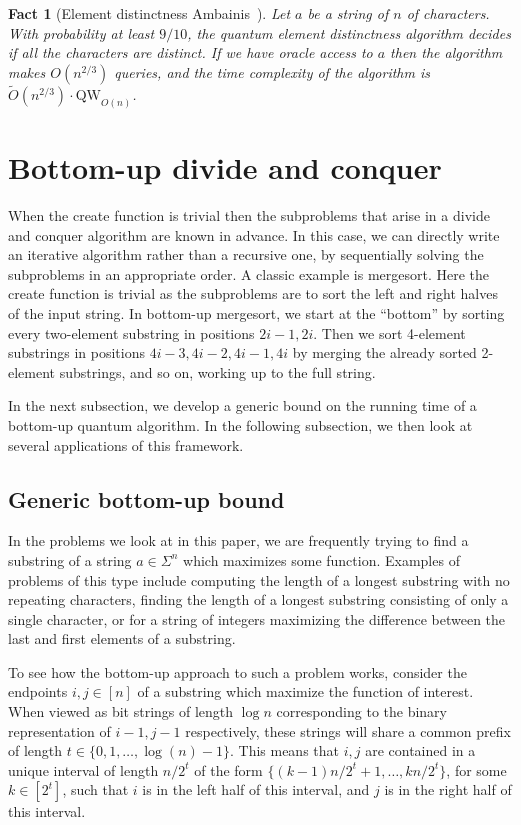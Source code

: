 \documentclass[12pt]{article}
\newcommand{\qw}{\mathrm{QW}}
\newtheorem{fact}[theorem]{Fact}
\theoremstyle{definition}
\begin{document}
\begin{fact}[{\sc Element distinctness} Ambainis~\cite{Amb07}]
\label{fact:ed}
Let $a$ be a string of $n$ of characters. 
With probability at least $9/10$,  the quantum element distinctness algorithm decides if all the characters are distinct.
If we have oracle access to $a$ then the algorithm makes ${O}(n^{2/3} )$ queries, and the time complexity of the algorithm is~$\widetilde{O}(n^{2/3}) \cdot \qw_{O(n)}$.
\end{fact}

\section{Bottom-up divide and conquer}
\label{sec:bottomup}
When the create function is trivial then the subproblems that arise in a divide and conquer algorithm are known in advance.  In this case, we can directly write an iterative algorithm rather than a recursive one, by sequentially solving the subproblems in an appropriate order.  A classic example is mergesort.
Here the create function is trivial as the subproblems are to sort the left and right halves of the input string.  In bottom-up mergesort, we start at the ``bottom'' by sorting every two-element substring in positions $2i-1, 2i$.
Then we sort 4-element substrings in positions $4i-3, 4i-2,4i-1,4i$ by merging the already sorted 2-element substrings, and so on, working up to the full string.  

In the next subsection, we develop a generic bound on the running time of a bottom-up quantum algorithm.  In the following subsection, we then look at several applications of this framework.

\subsection{Generic bottom-up bound}
In the problems we look at in this paper, we are frequently trying to find a substring of a string $a \in \Sigma^n$ which maximizes some function. 
Examples of problems of this type include computing the length of a longest substring with no repeating characters, finding the length of a longest substring consisting 
of only a single character, or for a string of integers maximizing the difference between the last and first elements of a substring.

To see how the bottom-up approach to such a problem works, consider the endpoints $i,j \in [n]$ of a substring which maximize the function of interest.  When viewed as bit strings of length $\log n$ corresponding to the binary representation of $i-1, j-1$ respectively, these strings will share a common prefix of length $t \in \{0, 1, \ldots, \log(n) -1\}$.
This means that $i,j$ are contained in a unique interval of length $n/2^t$ of the form $\{(k-1)n/2^t+1, \ldots, kn/2^t\}$, for some $k \in [2^t]$, such that $i$ is in the left half of this interval, and $j$ is in the right half of this interval.  
\end{document}
